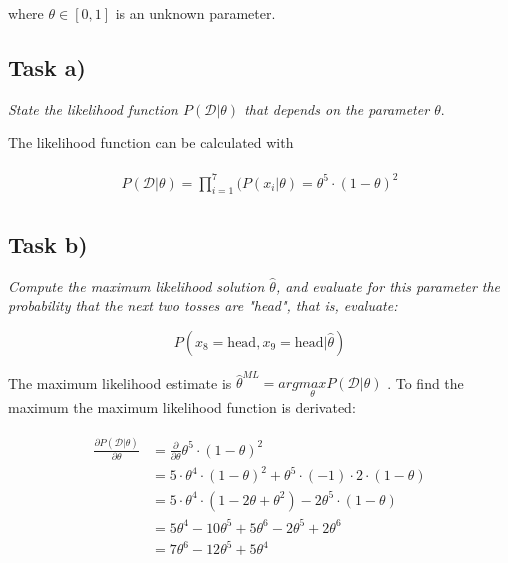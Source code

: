 \documentclass{article}
\begin{document}
where $\theta \in [0,1]$ is an unknown parameter.

\subsection*{Task a)}

\textit{State the likelihood function $P(\mathcal{D}|\theta)$ that depends on the parameter $\theta$}.

The likelihood function can be calculated with

\begin{align}
\begin{aligned}
P(\mathcal{D}|\theta) = \prod_{i = 1}^7(P(x_i|\theta) = \theta^5 \cdot (1 - \theta)^2 
\end{aligned}
\end{align}

\subsection*{Task b)}

\textit{Compute the maximum likelihood solution $\hat\theta$, and evaluate for this parameter the probability that the next two tosses are "head", that is, evaluate:}

\begin{equation}
P(x_8 = \text{head}, x_9 = \text{head} | \hat\theta)
\end{equation}

The maximum likelihood estimate is $\hat\theta^{ML} = arg \underset{\theta}{max}P(\mathcal{D}|\theta)$ . To find the maximum the maximum likelihood function is derivated:

\begin{align}
\begin{aligned}
\frac{\partial P(\mathcal{D}|\theta)}{\partial \theta} &= \frac{\partial}{\partial \theta} \theta^5 \cdot (1 - \theta)^2\\
									    &= 5 \cdot \theta^4 \cdot (1-\theta)^2 + \theta^5 \cdot (-1) \cdot 2 \cdot (1-\theta)\\
									    &= 5 \cdot \theta^4 \cdot (1 - 2\theta + \theta^2) - 2\theta^5 \cdot (1-\theta)\\
									    &= 5 \theta^4 - 10\theta^5 + 5\theta^6 - 2\theta^5 + 2\theta^6\\
									    &= 7\theta^6 - 12 \theta^5 + 5 \theta^4
\end{aligned}
\end{align}
\end{document}
